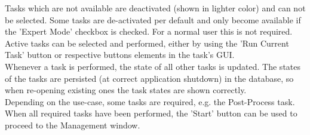 Tasks which are not available are deactivated (shown in lighter color) and can not be selected. Some tasks are de-activated per default and only become available if the 'Expert Mode' checkbox is checked. For a normal user this is not required.\\

Active tasks can be selected and performed, either by using the 'Run Current Task' button or respective buttons elements in the task's GUI. \\

Whenever a task is performed, the state of all other tasks is updated. The states of the tasks are persisted (at correct application shutdown) in the database, so when re-opening existing ones the task states are shown correctly. \\

Depending on the use-case, some tasks are required, e.g. the Post-Process task. When all required tasks have been performed, the 'Start' button can be used to proceed to the Management window.





















